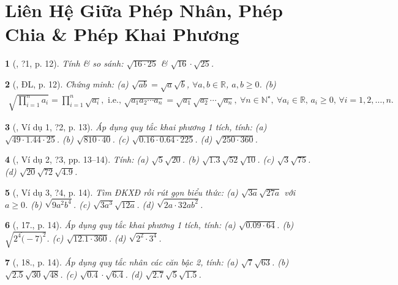 \documentclass{article}
\newtheorem{baitoan}{}
\begin{document}
\section{Liên Hệ Giữa Phép Nhân, Phép Chia \& Phép Khai Phương}

\begin{baitoan}[\cite{SGK_Toan_9_tap_1}, ?1, p. 12]
	Tính \& so sánh: $\sqrt{16\cdot25}$ \& $\sqrt{16}\cdot\sqrt{25}$.	
\end{baitoan}

\begin{baitoan}[\cite{SGK_Toan_9_tap_1}, ĐL, p. 12]
	Chứng minh: (a) $\sqrt{ab} = \sqrt{a}\sqrt{b}$, $\forall a,b\in\mathbb{R}$, $a,b\ge0$. (b)
	\begin{align*}
		\sqrt{\prod_{i=1}^n a_i} = \prod_{i=1}^n \sqrt{a_i},\mbox{ i.e., }\sqrt{a_1a_2\cdots a_n} = \sqrt{a_1}\sqrt{a_2}\cdots\sqrt{a_n},\ \forall n\in\mathbb{N}^\star,\ \forall a_i\in\mathbb{R},\,a_i\ge0,\,\forall i = 1,2,\ldots,n.
	\end{align*}
\end{baitoan}

\begin{baitoan}[\cite{SGK_Toan_9_tap_1}, Ví dụ 1, ?2, p. 13]
	Áp dụng quy tắc khai phương 1 tích, tính: (a) $\sqrt{49\cdot1.44\cdot25}$. (b) $\sqrt{810\cdot40}$. (c) $\sqrt{0.16\cdot0.64\cdot225}$. (d) $\sqrt{250\cdot360}$.
\end{baitoan}

\begin{baitoan}[\cite{SGK_Toan_9_tap_1}, Ví dụ 2, ?3, pp. 13--14]
	Tính: (a) $\sqrt{5}\sqrt{20}$. (b) $\sqrt{1.3}\sqrt{52}\sqrt{10}$. (c) $\sqrt{3}\sqrt{75}$. (d) $\sqrt{20}\sqrt{72}\sqrt{4.9}$.
\end{baitoan}

\begin{baitoan}[\cite{SGK_Toan_9_tap_1}, Ví dụ 3, ?4, p. 14]
	Tìm ĐKXĐ rồi rút gọn biểu thức: (a) $\sqrt{3a}\sqrt{27a}$ với $a\ge0$. (b) $\sqrt{9a^2b^4}$. (c) $\sqrt{3a^3}\sqrt{12a}$. (d) $\sqrt{2a\cdot32ab^2}$.
\end{baitoan}

\begin{baitoan}[\cite{SGK_Toan_9_tap_1}, 17., p. 14]
	Áp dụng quy tắc khai phương 1 tích, tính: (a) $\sqrt{0.09\cdot64}$. (b) $\sqrt{2^4\dot(-7)^2}$. (c) $\sqrt{12.1\cdot360}$. (d) $\sqrt{2^2\cdot3^4}$.
\end{baitoan}

\begin{baitoan}[\cite{SGK_Toan_9_tap_1}, 18., p. 14]
	Áp dụng quy tắc nhân các căn bậc 2, tính: (a) $\sqrt{7}\sqrt{63}$. (b) $\sqrt{2.5}\sqrt{30}\sqrt{48}$. (c) $\sqrt{0.4}\cdot\sqrt{6.4}$. (d) $\sqrt{2.7}\sqrt{5}\sqrt{1.5}$.
\end{baitoan}
\end{document}
